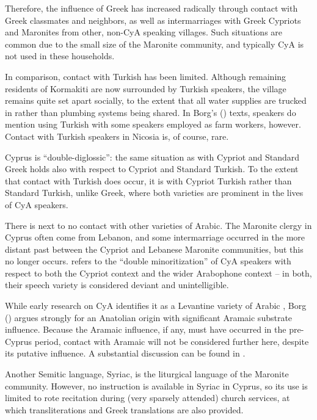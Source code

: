 \documentclass[output=paper]{langsci/langscibook}
\begin{document}
Therefore, the influence of Greek has increased radically through contact with Greek classmates and neighbors, as well as intermarriages with Greek Cypriots and Maronites from other, non-CyA speaking villages. Such situations are common due to the small size of the Maronite community, and typically CyA is not used in these households.

In comparison, contact with Turkish has been limited. Although remaining residents of Kormakiti are now surrounded by Turkish speakers, the village remains quite set apart socially, to the extent that all water supplies are trucked in rather than plumbing systems being shared. In Borg's (\citeyear{Borg1985}) texts, speakers do mention using Turkish with some speakers employed as farm workers, however. Contact with Turkish speakers in Nicosia is, of course, rare. 

Cyprus is “double-diglossic”: the same situation as with Cypriot and Standard Greek holds also with respect to Cypriot and Standard Turkish. To the extent that contact with Turkish does occur, it is with Cypriot Turkish rather than Standard Turkish, unlike Greek, where both varieties are prominent in the lives of CyA speakers. 

There is next to no contact with other varieties of Arabic. The Maronite clergy in Cyprus often come from Lebanon, and some intermarriage occurred in the more distant past between the Cypriot and Lebanese Maronite communities, but this no longer occurs. \citet{Roth2004} refers to the “double minoritization” of CyA speakers with respect to both the Cypriot context and the wider Arabophone context – in both, their speech variety is considered deviant and unintelligible. 

While early research on CyA identifies it as a Levantine variety of Arabic \citep{Tsiapera1969}, Borg (\citeyear{Borg1985,Borg2004}) argues strongly for an Anatolian origin with significant Aramaic substrate influence. Because the Aramaic influence, if any, must have occurred in the pre-Cyprus period, contact with Aramaic will not be considered further here, despite its putative influence. A substantial discussion can be found in \citet{Borg2004}.

Another Semitic language, Syriac, is the liturgical language of the Maronite community. However, no instruction is available in Syriac in Cyprus, so its use is limited to rote recitation during (very sparsely attended) church services, at which transliterations and Greek translations are also provided.
\end{document}
